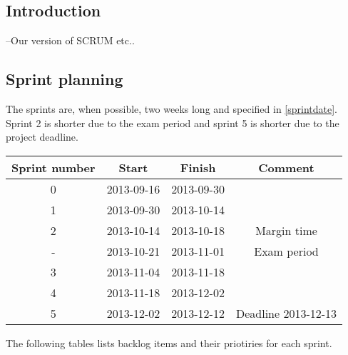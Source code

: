 

\subsection{Introduction}
--Our version of SCRUM etc..

\subsection{Sprint planning}

The sprints are, when possible, two weeks long and specified in \ref{sprintdate}. Sprint 2 is shorter due to the exam period and sprint 5 is shorter due to the project deadline.

\label{sprintdate}
\begin{center}
	\begin{Large}
	\begin{tabular}{|c|c|c|c|}
		\hline
		\large{\textbf{Sprint number}} & \large{\textbf{Start}} & \large{\textbf{Finish}} & \large{\textbf{Comment}} \\
		\hline
		\large{0} & \large{2013-09-16} & \large{2013-09-30} & \large{} \\
		\hline
		\large{1} & \large{2013-09-30} & \large{2013-10-14} & \large{} \\
		\hline
		\large{2} & \large{2013-10-14} & \large{2013-10-18} & \large{Margin time} \\
		\hline
		\large{-} & \large{2013-10-21} & \large{2013-11-01} & \large{Exam period} \\
		\hline
		\large{3} & \large{2013-11-04} & \large{2013-11-18} & \large{} \\
		\hline
		\large{4} & \large{2013-11-18} & \large{2013-12-02} & \large{} \\
		\hline	
		\large{5} & \large{2013-12-02} & \large{2013-12-12} & \large{Deadline 2013-12-13} \\
		\hline	
	\end{tabular}
	\end{Large}
\end{center}
\vspace{0.5cm}
The following tables lists backlog items and their priotiries for each sprint. \\


